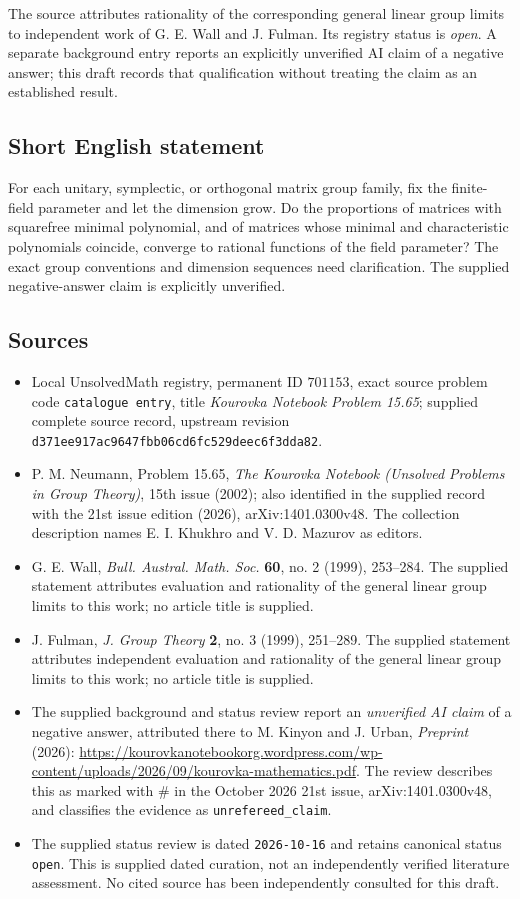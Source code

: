 \documentclass[11pt]{article}
\begin{document}
The source attributes rationality of the corresponding general linear group limits to independent work of G. E. Wall and J. Fulman. Its registry status is \emph{open}. A separate background entry reports an explicitly unverified AI claim of a negative answer; this draft records that qualification without treating the claim as an established result.
\subsection{Short English statement}
For each unitary, symplectic, or orthogonal matrix group family, fix the finite-field parameter and let the dimension grow. Do the proportions of matrices with squarefree minimal polynomial, and of matrices whose minimal and characteristic polynomials coincide, converge to rational functions of the field parameter? The exact group conventions and dimension sequences need clarification. The supplied negative-answer claim is explicitly unverified.
\subsection{Sources}
\begin{itemize}
\item Local UnsolvedMath registry, permanent ID \(701153\), exact source problem code \texttt{catalogue entry}, title \emph{Kourovka Notebook Problem 15.65}; supplied complete source record, upstream revision \texttt{d371ee917ac9647fbb06cd6fc529deec6f3dda82}.
\item P. M. Neumann, Problem 15.65, \emph{The Kourovka Notebook (Unsolved Problems in Group Theory)}, 15th issue (2002); also identified in the supplied record with the 21st issue edition (2026), arXiv:1401.0300v48. The collection description names E. I. Khukhro and V. D. Mazurov as editors.
\item G. E. Wall, \emph{Bull. Austral. Math. Soc.} \textbf{60}, no. 2 (1999), 253--284. The supplied statement attributes evaluation and rationality of the general linear group limits to this work; no article title is supplied.
\item J. Fulman, \emph{J. Group Theory} \textbf{2}, no. 3 (1999), 251--289. The supplied statement attributes independent evaluation and rationality of the general linear group limits to this work; no article title is supplied.
\item The supplied background and status review report an \emph{unverified AI claim} of a negative answer, attributed there to M. Kinyon and J. Urban, \emph{Preprint} (2026): \url{https://kourovkanotebookorg.wordpress.com/wp-content/uploads/2026/09/kourovka-mathematics.pdf}. The review describes this as marked with \(\#\) in the October 2026 21st issue, arXiv:1401.0300v48, and classifies the evidence as \texttt{unrefereed\_claim}.
\item The supplied status review is dated \texttt{2026-10-16} and retains canonical status \texttt{open}. This is supplied dated curation, not an independently verified literature assessment. No cited source has been independently consulted for this draft.
\end{itemize}
\end{document}
